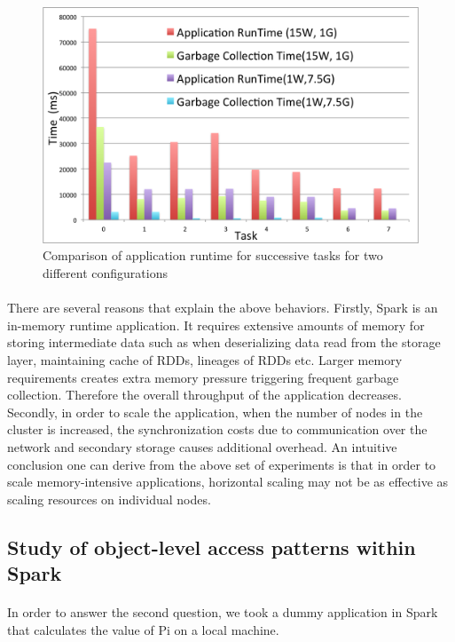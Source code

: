 \begin{figure}[!ht]
\caption{Comparison of application runtime for successive tasks for two different configurations}
\label{fig:exp5}
\includegraphics[scale=0.40]{./images/exp5.png}
\end{figure}

\paragraph{}
There are several reasons that explain the above behaviors.  Firstly,
Spark is an in-memory runtime application. It requires extensive amounts
of memory for storing intermediate data such as when deserializing data
read from the storage layer, maintaining cache of RDDs, lineages of RDDs
etc. Larger memory requirements creates extra memory pressure triggering
frequent garbage collection. Therefore the overall throughput of the
application decreases. Secondly, in order to scale the application, when
the number of nodes in the cluster is increased, the synchronization
costs due to communication over the network and secondary storage causes
additional overhead.  An intuitive conclusion one can derive from the
above set of experiments is that in order to scale memory-intensive
applications, horizontal scaling may not be as effective as scaling
resources on individual nodes. 


\subsection{Study of object-level access patterns within Spark} 
\paragraph{} In order to answer the second question, we took a dummy
application in Spark that calculates the value of Pi on a local machine. 

